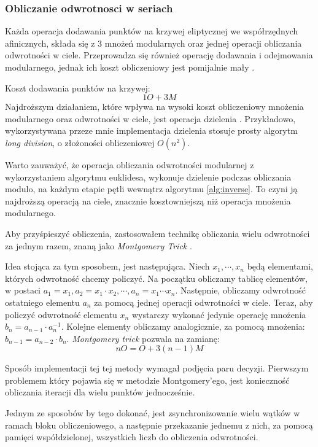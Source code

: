 \subsubsection{Obliczanie odwrotnosci w seriach}
Każda operacja dodawania punktów na krzywej eliptycznej we współrzędnych afinicznych, składa się z 3 mnożeń modularnych oraz jednej operacji obliczania odwrotności w ciele.
Przeprowadza się również operację dodawania i odejmowania modularnego, jednak ich koszt obliczeniowy jest pomijalnie mały \cite{Blake2005}.
\par
Koszt dodawania punktów na krzywej:
$$
    1O + 3M
$$
Najdroższym działaniem, które wpływa na wysoki koszt obliczeniowy  mnożenia modularnego oraz odwrotności w ciele,
jest operacja dzielenia \cite{Menezes2001}.
Przykładowo, wykorzystywana przeze mnie implementacja dzielenia stosuje prosty algorytm \textit{long division},
o złożoności obliczeniowej $O(n^2)$.
\par
Warto zauważyć, że operacja obliczania odwrotności modularnej z wykorzystaniem algorytmu euklidesa, wykonuje dzielenie
podczas obliczania modulo, na każdym etapie pętli wewnątrz algorytmu \ref{alg:inverse}.
To czyni ją najdroższą operacją na ciele, znacznie kosztowniejszą niż operacja mnożenia modularnego.
\par
Aby przyśpieszyć obliczenia, zastosowałem technikę obliczania wielu odwrotności za jednym razem,
znaną jako \textit{Montgomery Trick} \cite{Montgomery1987}.
\par
Idea stojąca za tym sposobem, jest następująca.
Niech $x_1, \cdots ,x_n$ będą elementami, których odwrotność chcemy policzyć.
Na początku obliczamy tablicę elementów, w postaci $a_1 = x_1, a_2 = x_1\cdot x_2 , \cdots, a_n = x_1 \cdots x_n$.
Następnie, obliczamy odwrotność ostatniego elementu $a_n$ za pomocą jednej operacji odwrotności w ciele.
Teraz, aby policzyć odwrotność elementu $x_n$ wystarczy wykonać jedynie operację mnożenia
$b_n = a_{n-1} \cdot a_{n}^{-1}$. Kolejne elementy obliczamy analogicznie, za pomocą mnożenia:
$b_{n-1} = a_{n-2} \cdot b_{n}$.
\textit{Montgomery trick} pozwala na zamianę:
$$
    nO = O + 3(n - 1)M
$$
\par
Sposób implementacji tej tej metody wymagał podjęcia paru decyzji.
Pierwszym problemem który pojawia się w metodzie Montgomery'ego,
jest konieczność
obliczania iteracji dla wielu punktów jednocześnie.
\par
Jednym ze sposobów by tego dokonać,
jest zsynchronizowanie wielu wątków w ramach bloku obliczeniowego, a następnie przekazanie
jednemu z nich, za pomocą pamięci współdzielonej, wszystkich liczb do obliczenia odwrotności.
